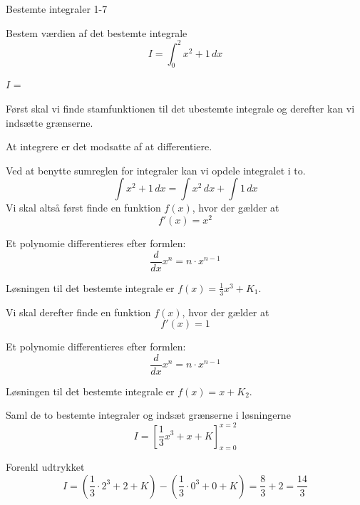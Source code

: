 \documentclass{article}
\begin{document}
\newpage

\begin{exercise}{Bestemte integraler 1-7}
	
	Bestem værdien af det bestemte integrale
	\[
	I = \int_0^2 x^2+1 \, dx
	\]
	
	$I$ =  
	
	
	\hint
	Først skal vi finde stamfunktionen til det ubestemte integrale og derefter kan vi indsætte grænserne.
	
	\hint
	At integrere er det modsatte af at differentiere.
	
	\hint
	
	Ved at benytte sumreglen for integraler kan vi opdele integralet i to.
	\[
	\int x^2+ 1 \, dx = \int x^2 \,dx + \int 1 \, dx
	\]
	\hint
	Vi skal altså først finde en funktion $f(x)$, hvor der gælder at
	\[
	f'(x) = x^2
	\]
	
	\hint
	Et polynomie differentieres efter formlen:
	\[
	\frac{d}{dx} x^n = n \cdot x^{n - 1}
	\]
	
	\hint
	Løsningen til det bestemte integrale er $f(x) = \frac{1}{3} x^3 + K_1$.
		
	\hint
	Vi skal  derefter finde en funktion $f(x)$, hvor der gælder at
	\[
	f'(x) = 1
	\]
	
	\hint
	Et polynomie differentieres efter formlen:
	\[
	\frac{d}{dx} x^n = n \cdot x^{n - 1}
	\]
	
	\hint
	Løsningen til det bestemte integrale er $f(x) = x + K_2$.
	
	
	
	\hint
	Saml de to bestemte integraler og indsæt grænserne i løsningerne
	\[
	I = \left[ \frac{1}{3} x^3 + x + K \right]_{x=0}^{x=2}
	\]
	
	\hint
	Forenkl udtrykket
	\[
	I = \left( \frac{1}{3} \cdot 2^3 + 2+ K \right) - \left( \frac{1}{3} \cdot 0^3 + 0 + K \right) = \frac{8}{3} + 2 = \frac{14}{3}
	\]
	
	
\end{exercise}

\newpage
\end{document}

